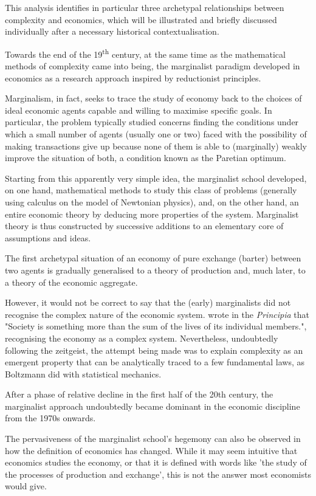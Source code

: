 This analysis identifies in particular three archetypal relationships between complexity and economics, which will be illustrated and briefly discussed individually after a necessary historical contextualisation.

Towards the end of the 19\textsuperscript{th} century, at the same time as the mathematical methods of complexity came into being, the marginalist paradigm developed in economics as a research approach inspired by reductionist principles.

Marginalism, in fact, seeks to trace the study of economy back to the choices of ideal economic agents capable and willing to maximise specific goals.
In particular, the problem typically studied concerns finding the conditions under which a small number of agents (usually one or two) faced with the possibility of making transactions give up because none of them is able to (marginally) weakly improve the situation of both, a condition known as the Paretian optimum.

Starting from this apparently very simple idea, the marginalist school developed, on one hand, mathematical methods to study this class of problems (generally using calculus on the model of Newtonian physics), and, on the other hand, an entire economic theory by deducing more properties of the system.
Marginalist theory is thus constructed by successive additions to an elementary core of assumptions and ideas.

The first archetypal situation of an economy of pure exchange (barter) between two agents is gradually generalised to a theory of production and, much later, to a theory of the economic aggregate.

However, it would not be correct to say that the (early) marginalists did not recognise the complex nature of the economic system.
\textcite[p. 20]{marshall1988} wrote in the \textit{Principia} that "Society is something more than the sum of the lives of its individual members.", recognising the economy as a complex system.
Nevertheless, undoubtedly following the zeitgeist, the attempt being made was to explain complexity as an emergent property that can be analytically traced to a few fundamental laws, as Boltzmann did with statistical mechanics.

After a phase of relative decline in the first half of the 20th century, the marginalist approach undoubtedly became dominant in the economic discipline from the 1970s onwards.

The pervasiveness of the marginalist school's hegemony can also be observed in how the definition of economics has changed.
While it may seem intuitive that economics studies the economy, or that it is defined with words like 'the study of the processes of production and exchange', this is not the answer most economists would give.

